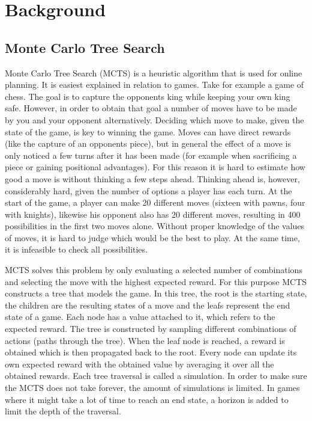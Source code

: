 
\section{Background}


\subsection{Monte Carlo Tree Search}

Monte Carlo Tree Search (MCTS) is a heuristic algorithm that is used for online planning. It is easiest explained in relation to games. Take for example a game of chess. The goal is to capture the opponents king while keeping your own king safe. However, in order to obtain that goal a number of moves have to be made by you and your opponent alternatively. Deciding which move to make, given the state of the game, is key to winning the game. Moves can have direct rewards (like the capture of an opponents piece), but in general the effect of a move is only noticed a few turns after it has been made (for example when sacrificing a piece or gaining positional advantages). For this reason it is hard to estimate how good a move is without thinking a few steps ahead. Thinking ahead is, however, considerably hard, given the number of options a player has each turn. At the start of the game, a player can make 20 different moves (sixteen with pawns, four with knights), likewise his opponent also has 20 different moves, resulting in 400 possibilities in the first two moves alone. Without proper knowledge of the values of moves, it is hard to judge which would be the best to play. At the same time, it is infeasible to check all possibilities. 

MCTS solves this problem by only evaluating a selected number of combinations and selecting the move with the highest expected reward. For this purpose MCTS constructs a tree that models the game. In this tree, the root is the starting state, the children are the resulting states of a move and the leafs represent the end state of a game. Each node has a value attached to it, which refers to the expected reward. The tree is constructed by sampling different combinations of actions (paths through the tree). When the leaf node is reached, a reward is obtained which is then propagated back to the root. Every node can update its own expected reward with the obtained value by averaging it over all the obtained rewards. Each tree traversal is called a simulation. In order to make sure the MCTS does not take forever, the amount of simulations is limited. In games where it might take a lot of time to reach an end state, a horizon is added to limit the depth of the traversal.  

